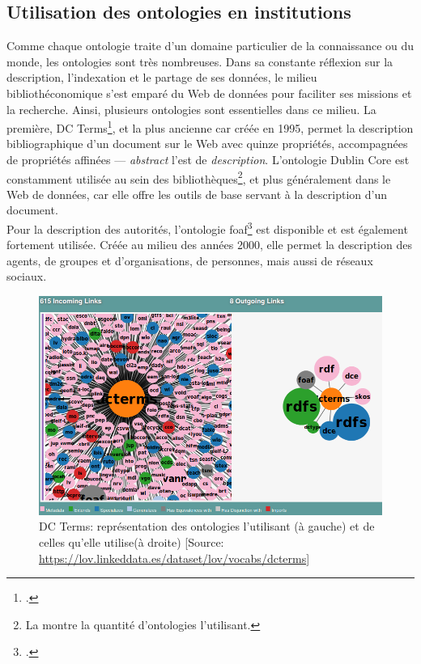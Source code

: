 \subsection{\label{II-B-3-b}Utilisation des ontologies en institutions}

Comme chaque ontologie traite d'un domaine particulier de la connaissance ou du monde, les ontologies sont très nombreuses. Dans sa constante réflexion sur la description, l'indexation et le partage de ses données, le milieu bibliothéconomique s'est emparé du Web de données pour faciliter ses missions et la recherche. Ainsi, plusieurs ontologies sont essentielles dans ce milieu. La première, DC Terms\footcite{noauthor_dublin_nodate}, et la plus ancienne car créée en 1995, permet la description bibliographique d'un document sur le Web avec quinze propriétés, accompagnées de propriétés affinées --- \textit{abstract} l'est de \textit{description}. L'ontologie Dublin Core est constamment utilisée au sein des bibliothèques\footnote{La  montre la quantité d'ontologies l'utilisant.}, et plus généralement dans le Web de données, car elle offre les outils de base servant à la description d'un document.\\

Pour la description des autorités, l'ontologie \ac{foaf}\footcite{noauthor_foaf_nodate} est disponible et est également fortement utilisée. Créée au milieu des années 2000, elle permet la description des agents, de groupes et d'organisations, de personnes, mais aussi de réseaux sociaux.\\

\begin{figure}[!h]
	\centering
	\includegraphics[width=13cm]{images/onto_dcterms.png}
	\caption[L'ontologie DC Terms]{DC Terms: représentation des ontologies l'utilisant (à gauche) et de celles qu'elle utilise(à droite) [Source: \url{https://lov.linkeddata.es/dataset/lov/vocabs/dcterms}]}
	\label{onto_dcterms}
\end{figure}
\medskip


